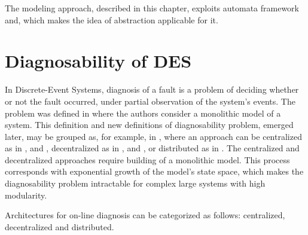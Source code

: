 The modeling approach, described in this chapter, exploits automata framework
and, which makes the idea of abstraction applicable for it.




\section{Diagnosability of DES}

In Discrete-Event Systems, diagnosis of a fault is a problem of deciding whether
or not the fault occurred, under partial observation of the system's events.
The problem was defined in \cite{sampath_diagnosability_1995} where the authors
consider a monolithic model of a system. This definition and new definitions
of diagnosability problem, emerged later, may be grouped as, for example, in
\cite{su_global_2005}, where an approach can be centralized as in
\cite{sampath_diagnosability_1995}, \cite{jiang_polynomial_2001} and
\cite{yoo_polynomial-time_2002}, 
decentralized as in \cite{debouk_coordinated_1998},
\cite{pencole_formal_2005} and \cite{qiu_decentralized_2006}, 
or distributed as in \cite{su_distributed_2002}.
The centralized and decentralized approaches require building of a monolithic
model. This process corresponds with exponential growth of the model's state
space, which makes the diagnosability problem intractable for complex large
systems with high modularity.

Architectures for on-line diagnosis can be categorized as follows:
centralized, decentralized and distributed.


